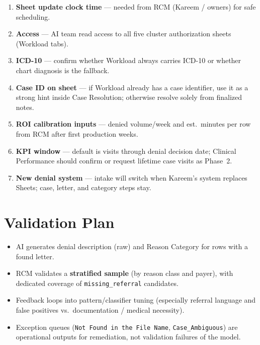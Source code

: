 \documentclass[11pt,a4paper]{article}
\begin{document}
\begin{enumerate}
  \item \textbf{Sheet update clock time} --- needed from RCM (Kareem / owners) for safe
        scheduling.
  \item \textbf{Access} --- AI team read access to all five cluster authorization sheets
        (Workload tabs).
  \item \textbf{ICD-10} --- confirm whether Workload always carries ICD-10 or whether
        chart diagnosis is the fallback.
  \item \textbf{Case ID on sheet} --- if Workload already has a case identifier, use it
        as a strong hint inside Case Resolution; otherwise resolve solely from finalized notes.
  \item \textbf{ROI calibration inputs} --- denied volume/week and est.\ minutes per row
        from RCM after first production weeks.
  \item \textbf{KPI window} --- default is visits through denial decision date; Clinical
        Performance should confirm or request lifetime case visits as Phase~2.
  \item \textbf{New denial system} --- intake will switch when Kareem's system replaces
        Sheets; case, letter, and category steps stay.
\end{enumerate}


\section{Validation Plan}

\begin{itemize}
  \item AI generates denial description (raw) and Reason Category for rows with a found letter.
  \item RCM validates a \textbf{stratified sample} (by reason class and payer), with
        dedicated coverage of \texttt{missing\_referral} candidates.
  \item Feedback loops into pattern/classifier tuning (especially referral language and
        false positives vs.\ documentation / medical necessity).
  \item Exception queues (\texttt{Not Found in the File Name}, \texttt{Case\_Ambiguous})
        are operational outputs for remediation, not validation failures of the model.
\end{itemize}
\end{document}
